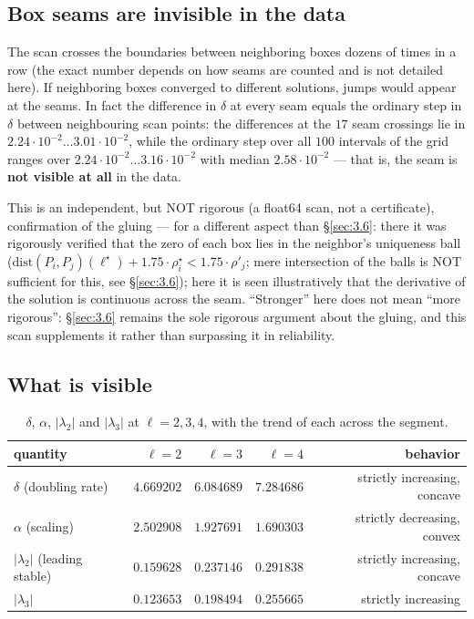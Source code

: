 \subsection{Box seams are invisible in the data}
\label{sec:7.2}

The scan crosses the boundaries between neighboring boxes dozens of times in
a row (the exact number depends on how seams are counted and is not detailed
here). If neighboring boxes converged to different solutions, jumps would
appear at the seams. In fact the difference in $\delta$ at every seam equals the
ordinary step in $\delta$ between neighbouring scan points: the differences at the $17$ seam crossings lie in $2.24\cdot 10^{-2}\dots 3.01\cdot 10^{-2}$, while the ordinary step over all $100$ intervals of the grid ranges over $2.24\cdot 10^{-2}\dots 3.16\cdot 10^{-2}$ with median $2.58\cdot 10^{-2}$ --- that
is, the seam is \textbf{not visible at all} in the data.

This is an independent, but NOT rigorous (a float64 scan, not a certificate),
confirmation of the gluing --- for a different aspect than \S\ref{sec:3.6}: there it was
rigorously verified that the zero of each box lies in the neighbor's
uniqueness ball ($\mathrm{dist}(P_i,P_j)(\ell^{\star}) + 1.75\cdot \rho^{\star}_i < 1.75\cdot \rho'_j$; mere
intersection of the balls is NOT sufficient for this, see \S\ref{sec:3.6}); here it is
seen illustratively that the derivative of the solution is continuous across
the seam. ``Stronger'' here does not mean ``more rigorous'': \S\ref{sec:3.6} remains the
sole rigorous argument about the gluing, and this scan supplements it rather
than surpassing it in reliability.


\subsection{What is visible}
\label{sec:7.3}

\begin{table}[ht]
\centering
\caption{$\delta$, $\alpha$, $|\lambda_{2}|$ and $|\lambda_{3}|$ at $\ell = 2, 3, 4$, with the trend of each across the segment.}
\label{tab:visible}
{\footnotesize\setlength{\tabcolsep}{4pt}
\begin{tabular}{lrrrr}
\toprule
quantity & $\ell=2$ & $\ell=3$ & $\ell=4$ & behavior \\
\midrule
$\delta$ (doubling rate) & $4.669202$ & $6.084689$ & $7.284686$ & strictly increasing, concave \\
$\alpha$ (scaling) & $2.502908$ & $1.927691$ & $1.690303$ & strictly decreasing, convex \\
$|\lambda_{2}|$ (leading stable) & $0.159628$ & $0.237146$ & $0.291838$ & strictly increasing, concave \\
$|\lambda_{3}|$ & $0.123653$ & $0.198494$ & $0.255665$ & strictly increasing \\
\bottomrule
\end{tabular}}
\end{table}

